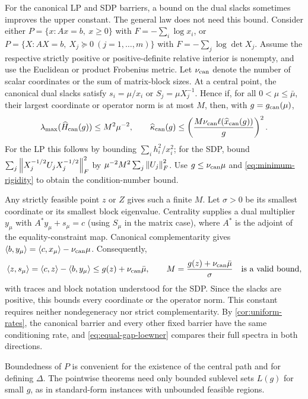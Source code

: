 For the canonical LP and SDP barriers, a bound on the dual slacks
sometimes improves the upper constant. The general law does not need
this bound. Consider either
$P=\{x:Ax=b,\ x\geq0\}$ with $F=-\sum_i\log x_i$, or
$P=\{X:AX=b,\ X_j\succeq0\ (j=1,\ldots,m)\}$ with
$F=-\sum_j\log\det X_j$. Assume the respective strictly positive or
positive-definite relative interior is nonempty, and use the Euclidean
or product Frobenius metric. Let $\nu_{\rm can}$ denote the number of
scalar coordinates or the sum of matrix-block sizes. At a central point,
the canonical dual slacks satisfy
$s_i=\mu/x_i$ or $S_j=\mu X_j^{-1}$. Hence if, for all
$0<\mu\leq\bar\mu$, their largest coordinate or operator norm is at
most $M$, then, with $g=g_{\rm can}(\mu)$,
\begin{equation}
 \lambda_{\max}(\widehat H_{\rm can}(g))\leq M^2\mu^{-2},\qquad
 \widehat\kappa_{\rm can}(g)
 \leq\left(\frac{M\nu_{\rm can}\ell(\widehat x_{\rm can}(g))}{g}\right)^2.
 \label{eq:canonical-constant}
\end{equation}
For the LP this follows by bounding
$\sum_i h_i^2/x_i^2$; for the SDP, bound
$\sum_j\left\lVert X_j^{-1/2}U_jX_j^{-1/2}\right\rVert_F^2$
by $\mu^{-2}M^2\sum_j\left\lVert U_j\right\rVert_F^2$. Use
$g\leq\nu_{\rm can}\mu$ and \eqref{eq:minimum-rigidity} to obtain
the condition-number bound.

Any strictly feasible point $z$ or $Z$ gives such a finite $M$. Let $\sigma>0$ be its smallest coordinate or its smallest
block eigenvalue. Centrality supplies a dual multiplier $y_\mu$ with
$A^*y_\mu+s_\mu=c$ (using $S_\mu$ in the matrix case), where $A^*$
is the adjoint of the equality-constraint map. Canonical
complementarity gives
$\left\langle b,y_\mu\right\rangle=\left\langle c,x_\mu\right\rangle-\nu_{\rm can}\mu$.
Consequently,
\[
 \left\langle z,s_\mu\right\rangle
 =\left\langle c,z\right\rangle-\left\langle b,y_\mu\right\rangle
 \leq g(z)+\nu_{\rm can}\bar\mu,
 \qquad
 M=\frac{g(z)+\nu_{\rm can}\bar\mu}{\sigma}
 \quad\text{is a valid bound},
\]
with traces and block notation understood for the SDP. Since the
slacks are positive, this bounds every coordinate or the operator norm.
This constant requires neither nondegeneracy nor strict
complementarity. By \cref{cor:uniform-rates}, the canonical barrier and
every other fixed barrier have the same conditioning rate, and
\eqref{eq:equal-gap-loewner} compares their full spectra in both
directions.

Boundedness of $P$ is convenient for the existence of the central path
and for defining $\Delta$. The pointwise theorems need only bounded
sublevel sets $L(g)$ for small $g$, as in standard-form instances with
unbounded feasible regions.

